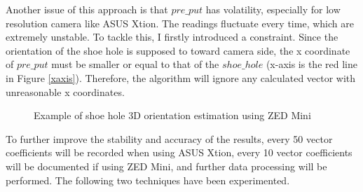 Another issue of this approach is that $pre\_put$ has volatility, especially for low resolution camera like ASUS Xtion. The readings fluctuate every time, which are extremely unstable. To tackle this, I firstly introduced a constraint. Since the orientation of the shoe hole is supposed to toward camera side, the x coordinate of $pre\_put$ must be smaller or equal to that of the $shoe\_hole$ (x-axis is the red line in Figure \ref{xaxis}). Therefore, the algorithm will ignore any calculated vector with unreasonable x coordinates. 

\begin{figure}[H]
\centering
{}
\caption{Example of shoe hole 3D orientation estimation using ZED Mini}
\end{figure}

To further improve the stability and accuracy of the results, every 50 vector coefficients will be recorded when using ASUS Xtion, every 10 vector coefficients will be documented if using ZED Mini, and further data processing will be performed. The following two techniques have been experimented.

